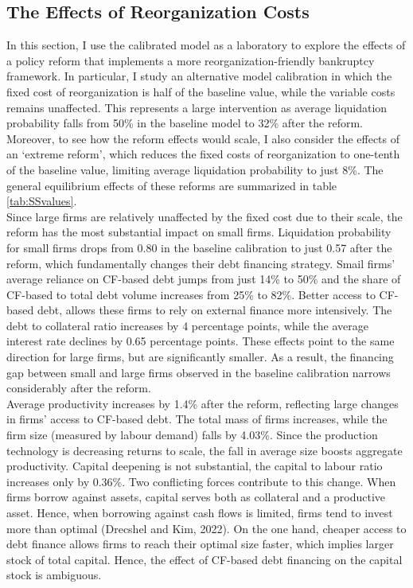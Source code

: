 \documentclass[12pt]{article}
\begin{document}
\subsection{The Effects of Reorganization Costs}
In this section, I use the calibrated model as a laboratory to explore the effects of a policy reform that implements a more reorganization-friendly bankruptcy framework. In particular, I study an alternative model calibration in which the fixed cost of reorganization is half of the baseline value, while the variable costs remains unaffected. This represents a large intervention as average liquidation probability falls from 50\% in the baseline model to 32\% after the reform. Moreover, to see how the reform effects would scale, I also consider the effects of an `extreme reform', which reduces the fixed costs of reorganization to one-tenth of the baseline value, limiting average liquidation probability to just 8\%.  The general equilibrium effects of these reforms are summarized in table \ref{tab:SSvalues}. \vspace{3mm} \\ 
Since large firms are relatively unaffected by the fixed cost due to their scale, the reform has the most substantial impact on small firms. Liquidation probability for small firms drops from 0.80 in the baseline calibration to just 0.57 after the reform, which fundamentally changes their debt financing strategy. Smail firms' average reliance on CF-based debt jumps from just 14\% to 50\% and the share of CF-based to total debt volume increases from 25\% to 82\%. Better access to CF-based debt, allows these firms to rely on external finance more intensively. The debt to collateral ratio increases by 4 percentage points, while the average interest rate declines by 0.65 percentage points. These effects point to the same direction for large firms, but are significantly smaller. As a result, the financing gap between small and large firms observed in the baseline calibration narrows considerably after the reform.  \vspace{3mm} \\ 
Average productivity increases by 1.4\% after the reform, reflecting large changes in firms' access to CF-based debt. The total mass of firms increases, while the firm size (measured by labour demand) falls by 4.03\%. Since the production technology is decreasing returns to scale, the fall in average size boosts aggregate productivity. Capital deepening is not substantial, the capital to labour ratio increases only by 0.36\%. Two conflicting forces contribute to this change. When firms borrow against assets, capital serves both as collateral and a productive asset. Hence, when borrowing against cash flows is limited, firms tend to invest more than optimal (Drecshel and Kim, 2022). On the one hand, cheaper access to debt finance allows firms to reach their optimal size faster, which implies larger stock of total capital. Hence, the effect of CF-based debt financing on the capital stock is ambiguous.
\end{document}
